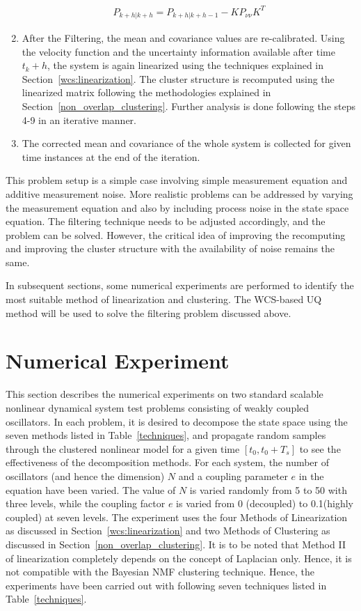 \begin{enumerate}
\begin{equation}
\begin{array}{l}
P_{k+h|k+h} = P_{k+h|k+h-1} - K P_{\nu \nu} K^T
\end{array}
\end{equation}
\item After the Filtering, the mean and covariance values are re-calibrated. Using the velocity function and the uncertainty information available after time $t_k + h$, the system is again linearized using the techniques explained in Section~\ref{wcs:linearization}. The cluster structure is recomputed using the linearized matrix following the methodologies explained in Section~\ref{non_overlap_clustering}. Further analysis is done following the steps 4-9 in an iterative manner.
\item The corrected mean and covariance of the whole system is collected for given time instances at the end of the iteration.
\end{enumerate}

This problem setup is a simple case involving simple measurement equation and additive measurement noise. More realistic problems can be addressed by varying the measurement equation and also by including process noise in the state space equation. The filtering technique needs to be adjusted accordingly, and the problem can be solved. However, the critical idea of improving the recomputing and improving the cluster structure with the availability of noise remains the same. 

In subsequent sections, some numerical experiments are performed to identify the most suitable method of linearization and clustering. The WCS-based UQ method will be used to solve the filtering problem discussed above.

\section{Numerical Experiment}
\label{wcs:num_exp}
This section describes the numerical experiments on two standard scalable nonlinear dynamical system test problems consisting of weakly coupled oscillators. In each problem, it is desired to decompose the state space using the seven methods listed in Table~\ref{techniques}, and propagate random samples through the clustered nonlinear model for a given time $[t_0,t_0 + T_s]$ to see the effectiveness of the decomposition methods. For each system, the number of oscillators (and hence the dimension) $N$ and a coupling parameter $e$ in the equation have been varied. The value of $N$ is varied randomly from 5 to 50 with three levels, while the coupling factor $e$ is varied from 0 (decoupled) to 0.1(highly coupled) at seven levels. The experiment uses the four Methods of Linearization as discussed in Section~\ref{wcs:linearization} and two Methods of Clustering as discussed in Section~\ref{non_overlap_clustering}. It is to be noted that Method II of linearization completely depends on the concept of Laplacian only. Hence, it is not compatible with the Bayesian NMF clustering technique. Hence, the experiments have been carried out with following seven techniques listed in Table~\ref{techniques}.

